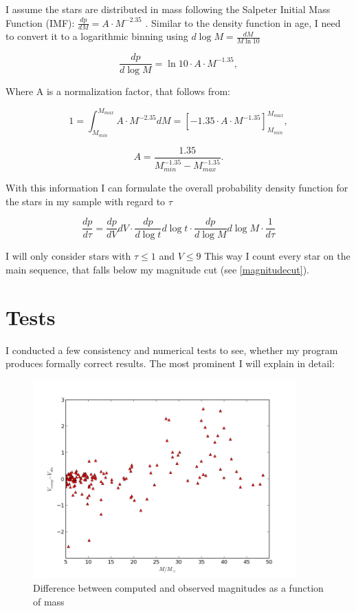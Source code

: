 \documentclass[a4paper,10pt]{article}
\begin{document}
 I assume the stars are distributed in mass following the Salpeter Initial Mass Function (IMF):
 $\frac{dp}{dM}=A\cdot M^{-2.35}$ \citep*{1955ApJ...121..161S}. Similar
 to the density function in age, I need to convert it to a logarithmic binning using $d\log M = \frac{dM}{M\ln 10}$
 
 \begin{equation}
  \frac{dp}{d\log M}=\ln 10 \cdot A\cdot M^{-1.35},
 \end{equation}
 
 Where A is a normalization factor, that follows from: 
 
 \begin{equation}
  1=\int_{M_{min}}^{M_{max}}A\cdot M^{-2.35} dM =\left[ -1.35\cdot A\cdot M^{-1.35}\right]_{M_{min}}^{M_{max}},
 \end{equation}
 
 \begin{equation}
  A= \frac{1.35}{M_{min}^{-1.35}-M_{max}^{-1.35}}.
 \end{equation}
 
 With this information I can formulate the overall probability density function for the stars in my sample with regard to $\tau$
 
 \begin{equation}
  \frac{dp}{d\tau}=\frac{dp}{dV}dV \cdot \frac{dp}{d\log t}d\log t \cdot \frac{dp}{d\log M}d\log M\cdot \frac{1}{d\tau}
 \end{equation}
 
 I will only consider stars with $\tau\le 1$ and $V\le 9$ This way I count every
 star on the main sequence, that falls below my magnitude cut (see \ref{magnitudecut}). 
 
 \newpage
 \section{Tests}
 I conducted a few consistency and numerical tests to see, whether my program produces formally correct results. 
 The most prominent I will explain in detail:
 
 \begin{figure}[h!]
  \includegraphics[width=0.9\textwidth]{diffmagmass}
  \caption{Difference between computed and observed magnitudes as a function of mass\label{diffmagmass}}
 \end{figure}
 
\end{document}
